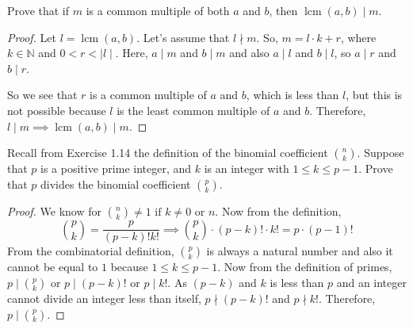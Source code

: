 \documentclass[12pt]{article}
\newenvironment{exercise}[2][Exercise]{\begin{trivlist}
\item[\hskip \labelsep {\bfseries #1}\hskip \labelsep {\bfseries #2.}]}{\end{trivlist}}
\DeclareMathOperator{\lcm}{lcm}
\begin{document}
\begin{exercise}{13}
	Prove that if \( m \) is a common multiple of both \( a \) and \( b \), then \( \lcm(a, b) \mid m \).
\end{exercise}

\begin{proof}
	Let \( l = \lcm(a, b) \). Let's assume that \( l \nmid m \).  So, \( m = l \cdot k + r \), where \( k \in \mathbb{N} \) and \( 0 < r < \mid l \mid \).  Here, \( a \mid m \) and \( b \mid m \) and also \( a \mid l \) and \( b \mid l \), so \( a \mid r \) and \( b \mid r \).

	So we see that \( r \) is a common multiple of \( a \) and \( b \), which is less than \( l \), but this is not possible because $l$ is the least common multiple of $a$ and $b$. Therefore, \( l \mid m \implies \lcm(a, b) \mid m \).
\end{proof}

\begin{exercise}{19}
	Recall from Exercise 1.14 the definition of the binomial coefficient \( \binom{n}{k} \). Suppose that \( p \) is a positive prime integer, and \( k \) is an integer with \( 1 \leq k \leq p-1 \). Prove that \( p \) divides the binomial coefficient \( \binom{p}{k} \).
\end{exercise}

\begin{proof}
	We know for \( \binom{n}{k}\neq 1 \text{ if } k\neq 0 \text{ or } n \). Now from the definition,
	\[
		\binom{p}{k} = \frac{p}{(p-k)!k!} \implies \binom{p}{k} \cdot (p-k)! \cdot k! = p \cdot (p-1)!
	\]
	From the combinatorial definition, \( \binom{p}{k} \) is always a natural number and also it cannot be equal to \( 1 \) because \( 1\leq k\leq p-1 \). Now from the definition of primes, \( p\mid \binom{p}{k} \) or \( p\mid (p-k)! \) or \( p\mid k! \). As \( (p-k) \) and \( k \) is less than \( p \) and an integer cannot divide an integer less than itself, \( p\nmid (p-k)! \) and \( p\nmid k! \). Therefore, \( p\mid \binom{p}{k} \).
\end{proof}












\end{document}
